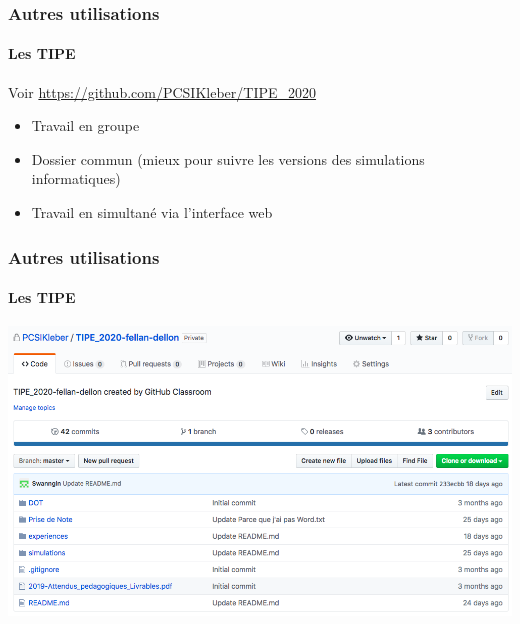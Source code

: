 
\begin{frame}
	\frametitle{Autres utilisations}
	\framesubtitle{Les TIPE}

	\begin{center}
		Voir \url{https://github.com/PCSIKleber/TIPE_2020}
	\end{center}

	\begin{itemize}[<+->]
		\item Travail en groupe

		\item Dossier commun (mieux pour suivre les versions des simulations informatiques)

		\item Travail en simultané via l'interface web
	\end{itemize}
\end{frame}

\begin{frame}
	\frametitle{Autres utilisations}
	\framesubtitle{Les TIPE}

	\begin{center}
		\includegraphics[width=\linewidth]{figures/TIPE1.png}
	\end{center}

\end{frame}


